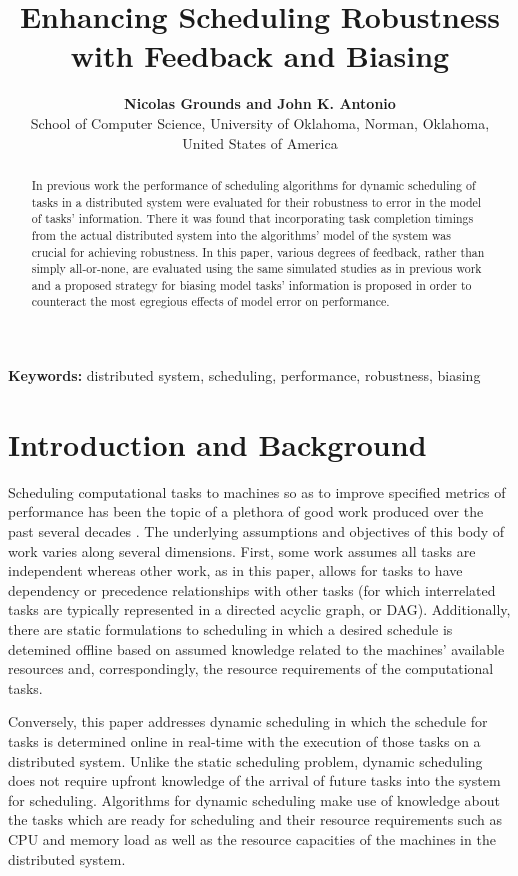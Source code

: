 \documentclass[10pt]{csce}
\title{\bf Enhancing Scheduling Robustness with Feedback and Biasing}
\author{
{\bfseries Nicolas Grounds and John K. Antonio}\\
School of Computer Science, University of Oklahoma, Norman, Oklahoma, United States of America\\
}
\begin{document}
\maketitle                        %

\begin{abstract}
In previous work the performance of scheduling algorithms for dynamic
scheduling of tasks in a distributed system were evaluated for their
robustness to error in the model of tasks' information.  There it was
found that incorporating task completion timings from the actual distributed
system into the algorithms' model of the system was crucial for achieving
robustness.  In this paper, various degrees of feedback, rather than simply
all-or-none, are evaluated using the same simulated studies as in previous
work and a proposed strategy for biasing model tasks' information is proposed
in order to counteract the most egregious effects of model error on
performance.
\end{abstract}


\vspace{1em}
\noindent\textbf{Keywords:}
 {\small distributed system, scheduling, performance, robustness, biasing}


\section{Introduction and Background}
\label{sec:Intro}

Scheduling computational tasks to machines so as to improve specified metrics
of performance has been the topic of a plethora of good work produced over the
past several decades \cite{taxonomy}. The underlying assumptions and objectives
of this body of work varies along several dimensions. First, some work assumes
all tasks are independent whereas other work, as in this paper, allows for
tasks to have dependency or precedence relationships with other tasks (for
which interrelated tasks are typically represented in a directed acyclic graph,
or DAG). Additionally, there are static formulations to scheduling in which a
desired schedule is detemined offline based on assumed knowledge related to the
machines' available resources and, correspondingly, the resource requirements
of the computational tasks.

Conversely, this paper addresses dynamic scheduling in which the schedule for
tasks is determined online in real-time with the execution of those tasks on a
distributed system. Unlike the static scheduling problem, dynamic scheduling
does not require upfront knowledge of the arrival of future tasks into the
system for scheduling. Algorithms for dynamic scheduling make use of knowledge
about the tasks which are ready for scheduling and their resource requirements
such as CPU and memory load as well as the resource capacities of the machines
in the distributed system.
\end{document}
